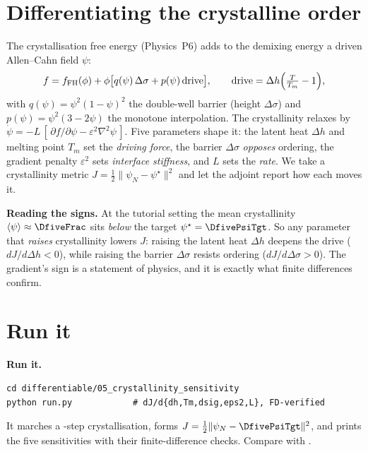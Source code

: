 \section{Differentiating the crystalline order}

The crystallisation free energy (Physics~P6) adds to the demixing energy
a driven Allen--Cahn field $\psi$:
%
\begin{equation}
  f = f_{\rm FH}(\phi) + \phi\big[q(\psi)\,\Delta\sigma
      + p(\psi)\,\text{drive}\big],
  \qquad \text{drive} = \Delta h\Big(\tfrac{T}{T_m}-1\Big),
\end{equation}
%
with $q(\psi)=\psi^2(1-\psi)^2$ the double-well barrier (height
$\Delta\sigma$) and $p(\psi)=\psi^2(3-2\psi)$ the monotone interpolation.
The crystallinity relaxes by $\dot\psi=-L\,[\,\partial f/\partial\psi -
\varepsilon^2\nabla^2\psi\,]$. Five parameters shape it: the latent heat
$\Delta h$ and melting point $T_m$ set the \emph{driving force}, the
barrier $\Delta\sigma$ \emph{opposes} ordering, the gradient penalty
$\varepsilon^2$ sets \emph{interface stiffness}, and $L$ sets the
\emph{rate}. We take a crystallinity metric $J=\tfrac12\lVert\psi_N-
\psi^\star\rVert^2$ and let the adjoint report how each moves it.

\begin{keybox}
\textbf{Reading the signs.} At the tutorial setting the mean crystallinity
$\langle\psi\rangle\approx\DfiveFrac$ sits \emph{below} the target
$\psi^\star=\DfivePsiTgt$. So any parameter that \emph{raises}
crystallinity lowers $J$: raising the latent heat $\Delta h$ deepens the
drive ($dJ/d\Delta h<0$), while raising the barrier $\Delta\sigma$
resists ordering ($dJ/d\Delta\sigma>0$). The gradient's sign is a
statement of physics, and it is exactly what finite differences confirm.
\end{keybox}

\section{Run it}

\begin{runbox}
\textbf{Run it.}
\begin{lstlisting}
cd differentiable/05_crystallinity_sensitivity
python run.py            # dJ/d{dh,Tm,dsig,eps2,L}, FD-verified
\end{lstlisting}
It marches a \DfiveSteps-step crystallisation, forms
$J=\tfrac12\lVert\psi_N-\DfivePsiTgt\rVert^2$, and prints the five
sensitivities with their finite-difference checks. Compare with
.
\end{runbox}

